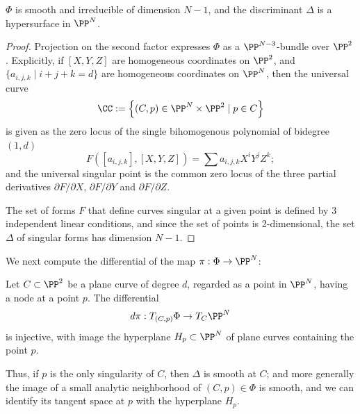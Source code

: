 \begin{proposition}
 $\Phi$ is smooth and irreducible of dimension $N-1$, and the discriminant $\Delta$ is a hypersurface in $\PP^N$.
\end{proposition}
\begin{proof}
Projection on the second factor expresses $\Phi$ as a $\PP^{N-3}$-bundle over $\PP^2$. Explicitly, if $[X,Y,Z]$ are homogeneous coordinates on $\PP^2$, and $\{a_{i,j,k} \mid i+j+k = d \}$ are homogeneous coordinates on $\PP^N$, then the universal curve 
$$
\CC := \left\{ (C, p) \in \PP^N \times \PP^2 \mid p \in C \right\}
$$
is given as the zero locus of the single bihomogenous polynomial of bidegree $(1, d)$
$$
F([a_{i,j,k}], [X,Y,Z] ) = \sum a_{i,j,k} X^iY^jZ^k;
$$
and the universal singular point is the common zero locus of the three partial derivatives $\partial F/\partial X$, $\partial F/\partial Y$ and  $\partial F/\partial Z$. 

The set of forms $F$ that define curves singular at a given point is defined by 3 independent linear conditions, and since the set of 
points is 2-dimensional, the set $\Delta$ of singular forms has dimension $N-1$.
\end{proof}
 
We next compute the differential of the map $\pi : \Phi \to \PP^N$:

\begin{lemma}\label{tangent space to discriminant}
Let $C \subset \PP^2$ be a plane curve of degree $d$, regarded as a point in $\PP^N$,  having a node at a point $p$. The differential 
$$
d\pi : T_{(C,p)}\Phi \to T_C \PP^N
$$
is injective, with image the hyperplane $H_p \subset \PP^N$ of plane curves containing the point $p$.
\end{lemma}

Thus, if $p$ is the only singularity of $C$, then $\Delta$ is smooth at $C$; and more generally the image of a small analytic neighborhood of $(C,p) \in \Phi$ is smooth, and we can identify its tangent space at $p$ with the hyperplane $H_p$. 

